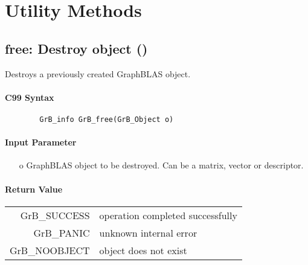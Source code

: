 \section{Utility Methods}


\subsection{{\sf free}: Destroy object ()}

Destroys a previously created GraphBLAS object.

\paragraph{C99 Syntax}

\begin{verbatim}
        GrB_info GrB_free(GrB_Object o)
\end{verbatim}


\paragraph{Input Parameter}

\begin{itemize}
	\item[{\sf o}] GraphBLAS object to be destroyed. Can be a matrix, vector or descriptor.
\end{itemize}

\paragraph{Return Value}

\begin{tabular}{rl}
{\sf GrB\_SUCCESS}	& operation completed successfully \\
{\sf GrB\_PANIC}	& unknown internal error \\
{\sf GrB\_NOOBJECT}	& object does not exist \\
\end{tabular}
